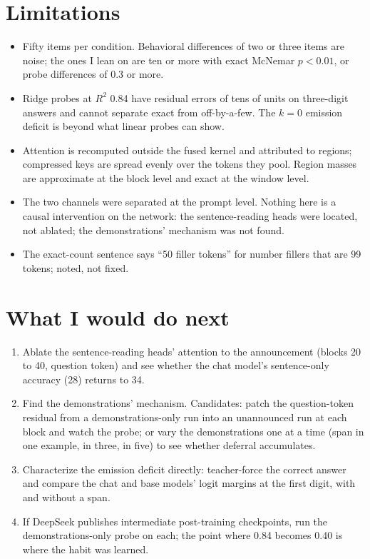 \documentclass[11pt]{article}
\begin{document}
\section{Limitations}

\begin{itemize}
\item Fifty items per condition. Behavioral differences of two or three items are noise; the ones I lean on are ten or more with exact McNemar $p<0.01$, or probe differences of 0.3 or more.
\item Ridge probes at $R^2$ 0.84 have residual errors of tens of units on three-digit answers and cannot separate exact from off-by-a-few. The $k=0$ emission deficit is beyond what linear probes can show.
\item Attention is recomputed outside the fused kernel and attributed to regions; compressed keys are spread evenly over the tokens they pool. Region masses are approximate at the block level and exact at the window level.
\item The two channels were separated at the prompt level. Nothing here is a causal intervention on the network: the sentence-reading heads were located, not ablated; the demonstrations' mechanism was not found.
\item The exact-count sentence says ``50 filler tokens'' for number fillers that are 99 tokens; noted, not fixed.
\end{itemize}

\section{What I would do next}

\begin{enumerate}
\item Ablate the sentence-reading heads' attention to the announcement (blocks 20 to 40, question token) and see whether the chat model's sentence-only accuracy (28) returns to 34.
\item Find the demonstrations' mechanism. Candidates: patch the question-token residual from a demonstrations-only run into an unannounced run at each block and watch the probe; or vary the demonstrations one at a time (span in one example, in three, in five) to see whether deferral accumulates.
\item Characterize the emission deficit directly: teacher-force the correct answer and compare the chat and base models' logit margins at the first digit, with and without a span.
\item If DeepSeek publishes intermediate post-training checkpoints, run the demonstrations-only probe on each; the point where 0.84 becomes 0.40 is where the habit was learned.
\end{enumerate}
\end{document}
